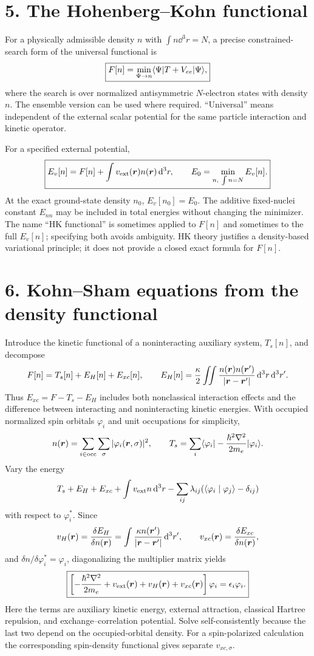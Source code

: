 \section*{5. The Hohenberg--Kohn functional}
For a physically admissible density $n$ with $\int n\dd^3r=N$, a precise constrained-search form of the universal functional is
\[
\boxed{F[n]=\min_{\Psi\to n}\langle\Psi\rvert T+V_{ee}\lvert\Psi\rangle,}
\]
where the search is over normalized antisymmetric $N$-electron states with density $n$. The ensemble version can be used where required. ``Universal'' means independent of the external scalar potential for the same particle interaction and kinetic operator.

For a specified external potential,
\[
\boxed{E_v[n]=F[n]+\int v_{\rm ext}(\boldsymbol{r})n(\boldsymbol{r})\mathop{}\!\mathrm{d}^3r,\qquad
E_0=\min_{n,\ \int n=N}E_v[n].}
\]
At the exact ground-state density $n_0$, $E_v[n_0]=E_0$. The additive fixed-nuclei constant $E_{nn}$ may be included in total energies without changing the minimizer. The name ``HK functional'' is sometimes applied to $F[n]$ and sometimes to the full $E_v[n]$; specifying both avoids ambiguity. HK theory justifies a density-based variational principle; it does not provide a closed exact formula for $F[n]$.

\section*{6. Kohn--Sham equations from the density functional}
Introduce the kinetic functional of a noninteracting auxiliary system, $T_s[n]$, and decompose
\[
F[n]=T_s[n]+E_H[n]+E_{xc}[n],\qquad
E_H[n]=\frac\kappa2\iint\frac{n(\boldsymbol{r})n(\boldsymbol{r}')}{|\boldsymbol{r}-\boldsymbol{r}'|}\mathop{}\!\mathrm{d}^3r\mathop{}\!\mathrm{d}^3r'.
\]
Thus $E_{xc}=F-T_s-E_H$ includes both nonclassical interaction effects and the difference between interacting and noninteracting kinetic energies. With occupied normalized spin orbitals $\varphi_i$ and unit occupations for simplicity,
\[
n(\boldsymbol{r})=\sum_{i\in\mathrm{occ}}\sum_\sigma|\varphi_i(\boldsymbol{r},\sigma)|^2,
\qquad T_s=\sum_i\langle\varphi_i\rvert-\frac{\hbar^2\nabla^2}{2m_e}\lvert\varphi_i\rangle.
\]
Vary the energy
\[
T_s+E_H+E_{xc}+\int v_{\rm ext}n\mathop{}\!\mathrm{d}^3r
-\sum_{ij}\lambda_{ij}(\langle\varphi_i\mid\varphi_j\rangle-\delta_{ij})
\]
with respect to $\varphi_i^*$. Since
\[
v_H(\boldsymbol{r})=\frac{\delta E_H}{\delta n(\boldsymbol{r})}
=\int\frac{\kappa n(\boldsymbol{r}')}{|\boldsymbol{r}-\boldsymbol{r}'|}\mathop{}\!\mathrm{d}^3r',\qquad
v_{xc}(\boldsymbol{r})=\frac{\delta E_{xc}}{\delta n(\boldsymbol{r})},
\]
and $\delta n/\delta\varphi_i^*=\varphi_i$, diagonalizing the multiplier matrix yields
\[
\boxed{\left[-\frac{\hbar^2\nabla^2}{2m_e}+v_{\rm ext}(\boldsymbol{r})
+v_H(\boldsymbol{r})+v_{xc}(\boldsymbol{r})\right]\varphi_i=\epsilon_i\varphi_i.}
\]
Here the terms are auxiliary kinetic energy, external attraction, classical Hartree repulsion, and exchange--correlation potential. Solve self-consistently because the last two depend on the occupied-orbital density. For a spin-polarized calculation the corresponding spin-density functional gives separate $v_{xc,\sigma}$.

